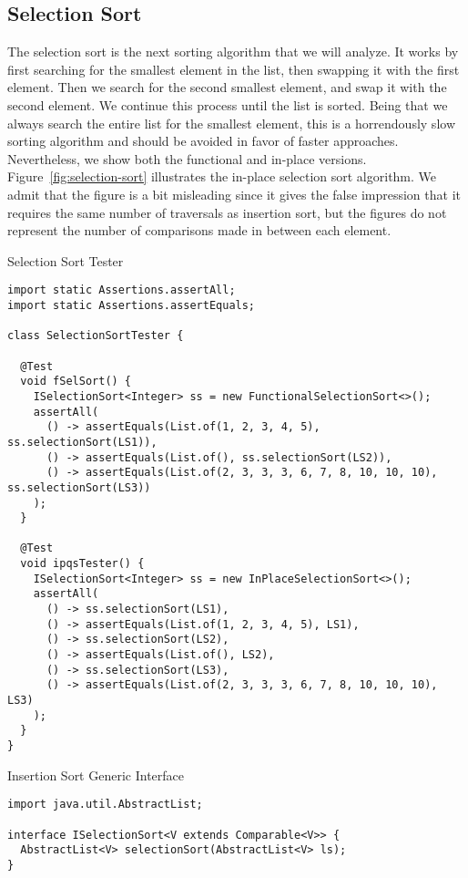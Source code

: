 \subsection*{Selection Sort}
The selection sort is the next sorting algorithm that we will analyze. It works by first searching for the smallest element in the list, then swapping it with the first element. Then we search for the second smallest element, and swap it with the second element. We continue this process until the list is sorted. Being that we always search the entire list for the smallest element, this is a horrendously slow sorting algorithm and should be avoided in favor of faster approaches. Nevertheless, we show both the functional and in-place versions. Figure~\ref{fig:selection-sort} illustrates the in-place selection sort algorithm. We admit that the figure is a bit misleading since it gives the false impression that it requires the same number of traversals as insertion sort, but the figures do not represent the number of comparisons made in between each element.

\begin{cl}{Selection Sort Tester}
\begin{lstlisting}[language=MyJava]
import static Assertions.assertAll;
import static Assertions.assertEquals;

class SelectionSortTester {

  @Test
  void fSelSort() {
    ISelectionSort<Integer> ss = new FunctionalSelectionSort<>();
    assertAll(
      () -> assertEquals(List.of(1, 2, 3, 4, 5), ss.selectionSort(LS1)),
      () -> assertEquals(List.of(), ss.selectionSort(LS2)),
      () -> assertEquals(List.of(2, 3, 3, 3, 6, 7, 8, 10, 10, 10), ss.selectionSort(LS3))
    );
  }

  @Test
  void ipqsTester() {
    ISelectionSort<Integer> ss = new InPlaceSelectionSort<>();
    assertAll(
      () -> ss.selectionSort(LS1),
      () -> assertEquals(List.of(1, 2, 3, 4, 5), LS1),
      () -> ss.selectionSort(LS2),
      () -> assertEquals(List.of(), LS2),
      () -> ss.selectionSort(LS3),
      () -> assertEquals(List.of(2, 3, 3, 3, 6, 7, 8, 10, 10, 10), LS3)
    );
  }
}
\end{lstlisting}
\end{cl}

\begin{cl}{Insertion Sort Generic Interface}
\begin{lstlisting}[language=MyJava]
import java.util.AbstractList;

interface ISelectionSort<V extends Comparable<V>> {
  AbstractList<V> selectionSort(AbstractList<V> ls);
}
\end{lstlisting}
\end{cl}

